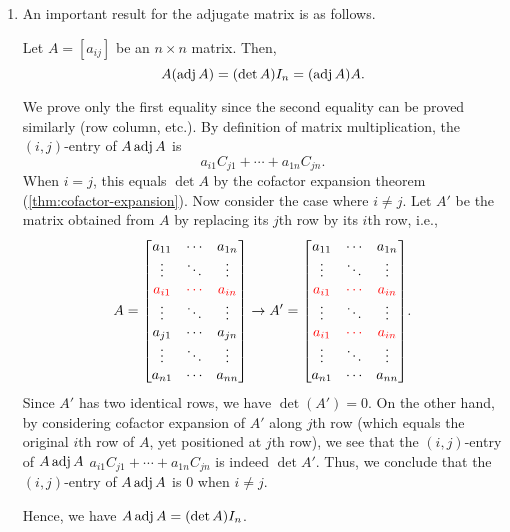 \begin{enumerate}
\item An important result for the adjugate matrix is as follows.
\begin{theorem}
\label{thm:a-adj-det-a}
Let \(A=[a_{ij}]\) be an \(n\times n\) matrix. Then,
\[
A(\operatorname{adj} A)=(\det A)I_n=(\operatorname{adj} A)A.
\]
\end{theorem}
\begin{pf}
We prove only the first equality since the second equality can be proved
similarly (row  column, etc.). By definition of matrix
multiplication, the \((i,j)\)-entry of \(A\operatorname{adj} A\) is 
\[
a_{i1}C_{j1}+\dotsb+a_{1n}C_{jn}.
\]
When \(i=j\), this equals \(\det A\) by the cofactor expansion theorem
(\cref{thm:cofactor-expansion}). Now consider the case where \(i\ne j\). Let
\(A'\) be the matrix obtained from \(A\) by replacing its \(j\)th row by its
\(i\)th row, i.e.,
\[
A=\mqty[
a_{11}&\cdots&a_{1n}\\
\vdots&\ddots&\vdots\\
\rc{a_{i1}}&\rc{\cdots}&\rc{a_{in}}\\
\vdots&\ddots&\vdots\\
a_{j1}&\cdots&a_{jn}\\
\vdots&\ddots&\vdots\\
a_{n1}&\cdots&a_{nn}\\
]
\to
A'=\mqty[
a_{11}&\cdots&a_{1n}\\
\vdots&\ddots&\vdots\\
\rc{a_{i1}}&\rc{\cdots}&\rc{a_{in}}\\
\vdots&\ddots&\vdots\\
\rc{a_{i1}}&\rc{\cdots}&\rc{a_{in}}\\
\vdots&\ddots&\vdots\\
a_{n1}&\cdots&a_{nn}\\
].
\]
Since \(A'\) has two identical rows, we have \(\det(A')=0\). On the other hand,
by considering cofactor expansion of \(A'\) along \(j\)th row (which equals the
original \(i\)th row of \(A\), yet positioned at \(j\)th row), we see that the
\((i,j)\)-entry of \(A\operatorname{adj} A\) \(a_{i1}C_{j1}+\dotsb+a_{1n}C_{jn}\) is indeed
\(\det A'\). Thus, we conclude that the \((i,j)\)-entry of \(A\operatorname{adj} A\) is \(0\)
when \(i\ne j\).

Hence, we have \(A\operatorname{adj} A=(\det A)I_n\).
\end{pf}


\end{enumerate}
